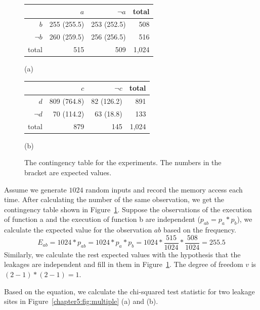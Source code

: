 \begin{figure}[h]
  \begin{minipage}{0.40\linewidth}
      \begin{tabular}{rrrr}
        \toprule
        & $a$ & $\lnot a$  & total\\
        \midrule
        $b$   & 255 (255.5) & 253 (252.5) &   508  \\
        $\lnot b$   & 260 (259.5)  & 256 (256.5) &    516   \\
        total &   515 &  509   & 1,024   \\
        \bottomrule
      \end{tabular}\caption*{(a)}
  \end{minipage}
\hspace{-15pt}
\hfill
\hspace{-15pt}
  \begin{minipage}{0.40\linewidth}
      \begin{tabular}{rrrr}
        \toprule
        & $c$ & $\lnot c$  & total\\
        \midrule
        $d$   & 809 (764.8) & 82 (126.2) & 891    \\
        $\lnot d$   & 70 (114.2)  & 63 (18.8)&  133     \\
        total &  879 &  145  & 1,024    \\
        \bottomrule
      \end{tabular}\caption*{(b)}
  \end{minipage}
  \caption{The contingency table for the experiments. The numbers in the bracket are expected values. }\label{chapter5:fig:con_table}
\end{figure}


Assume we generate $1024$ random inputs and record the memory access each time.  After calculating the number of the same observation, we get the contingency table shown in Figure~\ref{chapter5:fig:con_table}. Suppose the observations of the execution of function \textsf{a} and the execution of function \textsf{b} are independent ($p_{ab} = p_a*p_b$),  we calculate the expected value for the observation $ab$ based on the frequency.
\[ E_{ab} = 1024*p_{ab} = 1024*p_a*p_b = 1024*\frac{515}{1024}*\frac{508}{1024} = 255.5\]
Similarly, we calculate the rest expected values with the hypothesis that the leakages are independent and fill in them in Figure~\ref{chapter5:fig:con_table}. The degree of freedom $v$ is $(2-1)*(2-1) = 1$.

Based on the equation, we calculate the chi-squared test statistic for two leakage sites in Figure~\ref{chapter5:fig:multiple} (a) and (b).

